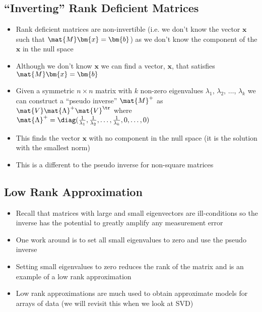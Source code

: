 \begin{slide}
\section[-2]{``Inverting'' Rank Deficient Matrices}

\begin{PauseHighLight}
  \begin{itemize}
  \item Rank deficient matrices are non-invertible (i.e. we don't know
    the vector $\bm{x}$ such that $\mat{M} \bm{x} = \bm{b}$) as we don't know
    the component of the $\bm{x}$ in the null space\pause
  \item Although we don't know $\bm{x}$ we can find a vector,
    $\bm{x}$, that satisfies $\mat{M} \bm{x} = \bm{b}$\pause
  \item Given a symmetric $n\times n$ matrix with $k$ non-zero eigenvalues
    $\lambda_1$, $\lambda_2$, $\ldots$, $\lambda_k$ we can construct
    a ``pseudo inverse'' $\mat{M}^{+}$ as $\mat{V} \mat{\Lambda}^+
    \mat{V}^\tr$ where  $\mat{\Lambda}^{+} = \diag(\tfrac{1}{\lambda_1},
    \tfrac{1}{\lambda_2}, \ldots, \tfrac{1}{\lambda_k}, 0, \ldots,0)$\pause
  \item This finds the vector $\bm{x}$ with no component in the null
    space\pause{} (it is the solution with the smallest norm)\pauseb
  \item This is a different to the pseudo inverse for non-square matrices\pause
  \end{itemize}
\end{PauseHighLight}

\end{slide}


\begin{slide}
\section{Low Rank Approximation}

\begin{PauseHighLight}
  \begin{itemize}
  \item Recall that matrices with large and small eigenvectors are
    ill-conditions so the inverse has the potential to greatly amplify any
    measurement error\pause
  \item One work around is to set all small eigenvalues to zero and
    use the pseudo inverse\pause
  \item Setting small eigenvalues to zero reduces the rank of the
    matrix and is an example of a low rank approximation\pause
  \item Low rank approximations are much used to obtain approximate
    models for arrays of data\pause{} (we will revisit this when we look at SVD)\pauseb
  \end{itemize}
\end{PauseHighLight}

\end{slide}




